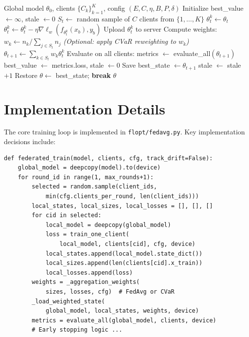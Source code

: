 \documentclass[11pt,a4paper]{report}
\begin{document}
\begin{algorithm}[H]
\caption{Federated Averaging with Early Stopping}
\label{alg:fedavg}
\begin{algorithmic}[1]
\REQUIRE Global model $\theta_0$, clients $\{C_k\}_{k=1}^{K}$, config $(E, C, \eta, B, P, \delta)$
\STATE Initialize best\_value $\leftarrow \infty$, stale $\leftarrow 0$
    \STATE $S_t \leftarrow$ random sample of $C$ clients from $\{1, \ldots, K\}$
        \STATE $\theta_t^k \leftarrow \theta_t$ 
                \STATE $\theta_t^k \leftarrow \theta_t^k - \eta \nabla \ell_w(f_{\theta_t^k}(x_b), y_b)$
            \ENDFOR
        \ENDFOR
        \STATE Upload $\theta_t^k$ to server
    \ENDFOR
    \STATE Compute weights: $w_k \leftarrow n_k / \sum_{j \in S_t} n_j$
    \STATE \textit{(Optional: apply CVaR reweighting to $w_k$)}
    \STATE $\theta_{t+1} \leftarrow \sum_{k \in S_t} w_k \theta_t^k$
    \STATE Evaluate on all clients: metrics $\leftarrow$ evaluate\_all$(\theta_{t+1})$
        \STATE best\_value $\leftarrow$ metrics.loss, stale $\leftarrow 0$
        \STATE Save best\_state $\leftarrow \theta_{t+1}$
    \ELSE
        \STATE stale $\leftarrow$ stale $+ 1$
    \ENDIF
        \STATE Restore $\theta \leftarrow$ best\_state; \textbf{break}
    \ENDIF
\ENDFOR
\RETURN $\theta$
\end{algorithmic}
\end{algorithm}

\section{Implementation Details}

The core training loop is implemented in \texttt{flopt/fedavg.py}. Key implementation decisions include:

\begin{lstlisting}
def federated_train(model, clients, cfg, track_drift=False):
    global_model = deepcopy(model).to(device)
    for round_id in range(1, max_rounds+1):
        selected = random.sample(client_ids,
            min(cfg.clients_per_round, len(client_ids)))
        local_states, local_sizes, local_losses = [], [], []
        for cid in selected:
            local_model = deepcopy(global_model)
            loss = train_one_client(
                local_model, clients[cid], cfg, device)
            local_states.append(local_model.state_dict())
            local_sizes.append(len(clients[cid].x_train))
            local_losses.append(loss)
        weights = _aggregation_weights(
            sizes, losses, cfg)  # FedAvg or CVaR
        _load_weighted_state(
            global_model, local_states, weights, device)
        metrics = evaluate_all(global_model, clients, device)
        # Early stopping logic ...
\end{lstlisting}
\end{document}
